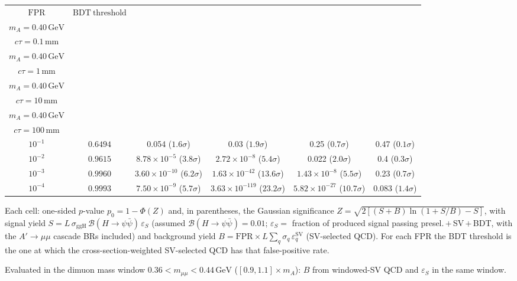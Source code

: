 \documentclass[10pt,a4paper]{article}
\begin{document}
{\begin{tabular}{cccccc}
\toprule
$\mathrm{FPR}$ & $\mathrm{BDT\ threshold}$ & \shortstack{$m_{\pi}=4\,\mathrm{GeV}$\\$m_{A}=0.40\,\mathrm{GeV}$\\$c\tau=0.1\,\mathrm{mm}$} & \shortstack{$m_{\pi}=4\,\mathrm{GeV}$\\$m_{A}=0.40\,\mathrm{GeV}$\\$c\tau=1\,\mathrm{mm}$} & \shortstack{$m_{\pi}=4\,\mathrm{GeV}$\\$m_{A}=0.40\,\mathrm{GeV}$\\$c\tau=10\,\mathrm{mm}$} & \shortstack{$m_{\pi}=4\,\mathrm{GeV}$\\$m_{A}=0.40\,\mathrm{GeV}$\\$c\tau=100\,\mathrm{mm}$} \\
\midrule
$10^{-1}$ & $0.6494$ & 0.054 ($1.6\sigma$) & 0.03 ($1.9\sigma$) & 0.25 ($0.7\sigma$) & 0.47 ($0.1\sigma$)\\
$10^{-2}$ & $0.9615$ & $8.78\times10^{-5}$ ($3.8\sigma$) & $2.72\times10^{-8}$ ($5.4\sigma$) & 0.022 ($2.0\sigma$) & 0.4 ($0.3\sigma$)\\
$10^{-3}$ & $0.9960$ & $3.60\times10^{-10}$ ($6.2\sigma$) & $1.63\times10^{-42}$ ($13.6\sigma$) & $1.43\times10^{-8}$ ($5.5\sigma$) & 0.23 ($0.7\sigma$)\\
$10^{-4}$ & $0.9993$ & $7.50\times10^{-9}$ ($5.7\sigma$) & $3.63\times10^{-119}$ ($23.2\sigma$) & $5.82\times10^{-27}$ ($10.7\sigma$) & 0.083 ($1.4\sigma$)\\
\bottomrule
\end{tabular}

{\small Each cell: one-sided $p$-value $p_0=1-\Phi(Z)$ and, in parentheses, the Gaussian significance $Z=\sqrt{2\left[(S{+}B)\ln(1{+}S/B)-S\right]}$, with signal yield $S=L\,\sigma_{\mathrm{ggH}}\,\mathcal{B}(H\to\psi\bar{\psi})\,\varepsilon_S$ (assumed $\mathcal{B}(H\to\psi\bar{\psi})=0.01$; $\varepsilon_S=$ fraction of produced signal passing presel.\,$+$\,SV\,$+$\,BDT, with the $A'\to\mu\mu$ cascade BRs included) and background yield $B=\mathrm{FPR}\times L\sum_q\sigma_q\,\varepsilon_q^{\mathrm{SV}}$ (SV-selected QCD). For each FPR the BDT threshold is the one at which the cross-section-weighted SV-selected QCD has that false-positive rate.}

{\small Evaluated in the dimuon mass window $0.36<m_{\mu\mu}<0.44\,\mathrm{GeV}$ ($[0.9,1.1]\times m_A$): $B$ from windowed-SV QCD and $\varepsilon_S$ in the same window.}

}\clearpage
\end{document}
